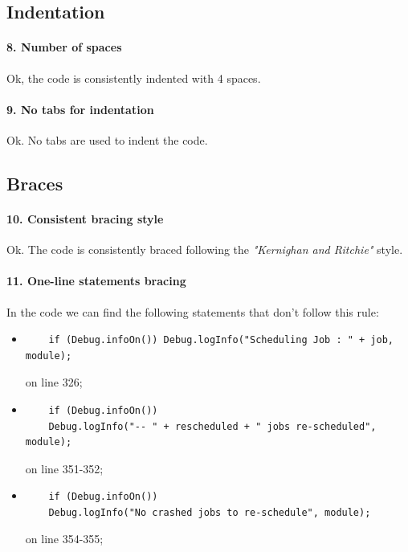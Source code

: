\documentclass[english]{article}
\begin{document}

\subsection{Indentation}

\paragraph{8. Number of spaces}
Ok, the code is consistently indented with 4 spaces.

\paragraph{9. No tabs for indentation}
Ok. No tabs are used to indent the code.

\subsection{Braces}

\paragraph{10. Consistent bracing style}
Ok.
The code is consistently braced following the \textit{"Kernighan and Ritchie"} style.

\paragraph{11. One-line statements bracing}
In the code we can find the following statements that don't follow this rule:
\begin{itemize}
	\item 
	\begin{lstlisting} 
	if (Debug.infoOn()) Debug.logInfo("Scheduling Job : " + job, module); \end{lstlisting}
	 on line 326;
	\item 
	\begin{lstlisting} 
	if (Debug.infoOn())
    Debug.logInfo("-- " + rescheduled + " jobs re-scheduled", module); \end{lstlisting} 
    on line 351-352;
    \item 
    \begin{lstlisting} 
    if (Debug.infoOn())
    Debug.logInfo("No crashed jobs to re-schedule", module); \end{lstlisting}
     on line 354-355;
\end{itemize}
\end{document}
